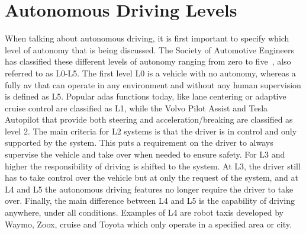 
\section{Autonomous Driving Levels}
\label{sec:intro_ad}
When talking about autonomous driving, it is first important to specify which level of autonomy that is being discussed. The Society of Automotive Engineers has classified these different levels of autonomy ranging from zero to five~\cite{SAE2021}, also referred to as L0-L5. The first level L0 is a vehicle with no autonomy, whereas a fully \gls{av} that can operate in any environment and without any human supervision is defined as L5. Popular \gls{adas} functions today, like lane centering or adaptive cruise control are classified as L1, while the Volvo Pilot Assist and Tesla Autopilot that provide both steering and acceleration/breaking are classified as level 2. The main criteria for L2 systems is that the driver is in control and only supported by the system. This puts a requirement on the driver to always supervise the vehicle and take over when needed to ensure safety. For L3 and higher the responsibility of driving is shifted to the system. At L3, the driver still has to take control over the vehicle but at only the request of the system, and at L4 and L5 the autonomous driving features no longer require the driver to take over. Finally, the main difference between L4 and L5 is the capability of driving anywhere, under all conditions. Examples of L4 are robot taxis developed by Waymo, Zoox, cruise and Toyota which only operate in a specified area or city. 

